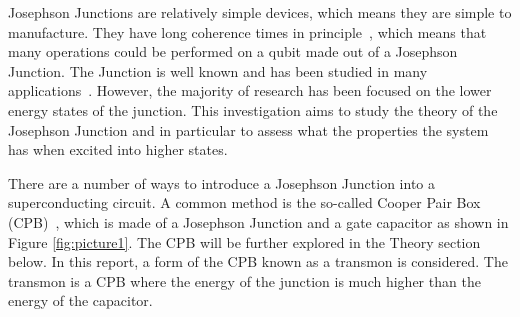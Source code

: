 \documentclass[11pt]{article}
\begin{document}
Josephson Junctions are relatively simple devices, which means they are simple to manufacture. They have long coherence times in principle~\cite{paikObservationHighCoherence2011}, which means that many operations could be performed on a qubit made out of a Josephson Junction. The Junction is well known and has been studied in many applications~\cite{yuCoherentTemporalOscillations2002,simmondsDecoherenceJosephsonPhase2004}. However, the majority of research has been focused on the lower energy states of the junction. This investigation aims to study the theory of the Josephson Junction and in particular to assess what the properties the system has when excited into higher states.

There are a number of ways to introduce a Josephson Junction into a superconducting circuit. A common method is the so-called Cooper Pair Box (CPB)~\cite{bladhSingleCooperpairBox2005}, which is made of a Josephson Junction and a gate capacitor as shown in Figure \ref{fig:picture1}. The CPB will be further explored in the Theory section below. In this report, a form of the CPB known as a transmon is considered. The transmon is a CPB where the energy of the junction is much higher than the energy of the capacitor.
\end{document}

